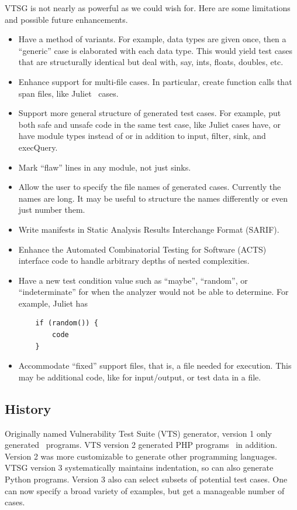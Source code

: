 VTSG is not nearly as powerful as we could wish for.  Here are some limitations and
possible future enhancements.
\begin{itemize}
  \item Have a method of variants.  For example, data types are given once, then a
    ``generic'' case is elaborated with each data type.  This would yield test cases
    that are structurally identical but deal with, say, ints, floats, doubles, etc.
  \item Enhance support for multi-file cases.  In particular, create function calls
    that span files, like
    Juliet~\cite{Black2018Juliet1.3changes} cases.
  \item Support more general structure of generated test cases.  For example, put both
    safe and unsafe code in the same test case, like Juliet cases have, or have
    module types instead of or in addition to input, filter, sink, and execQuery.
  \item Mark ``flaw'' lines in any module, not just sinks.
  \item Allow the user to specify the file names of generated cases.  Currently the
    names are long.  It may be useful to structure the names differently or
    even just number them.
  \item Write manifests in Static Analysis Results Interchange Format (SARIF).
  \item Enhance the Automated Combinatorial Testing for Software (ACTS) interface
    code to handle arbitrary depths of nested
    complexities.
  \item Have a new test condition value such as ``maybe'', ``random'', or
    ``indeterminate'' for when the analyzer would not be able to determine.  For
    example, Juliet has
    \begin{verbatim}
    if (random()) {
        code
    }
    \end{verbatim}
  \item Accommodate ``fixed'' support files, that is, a file needed for execution.
    This may be additional code, like for input/output, or test data in a file.
\end{itemize}


\subsection{History}

Originally named Vulnerability Test Suite (VTS) generator, version 1 only
generated \CSharp\ programs. VTS version 2 generated PHP
programs~\cite{StivaletFongVTSPHP2016} in addition.  Version 2 was more
customizable to generate other programming languages.
VTSG version 3 systematically maintains indentation, so can also generate Python
programs.
Version 3 also can select subsets of potential test cases.  One can now specify a
broad variety of examples, but get a manageable number of cases.


